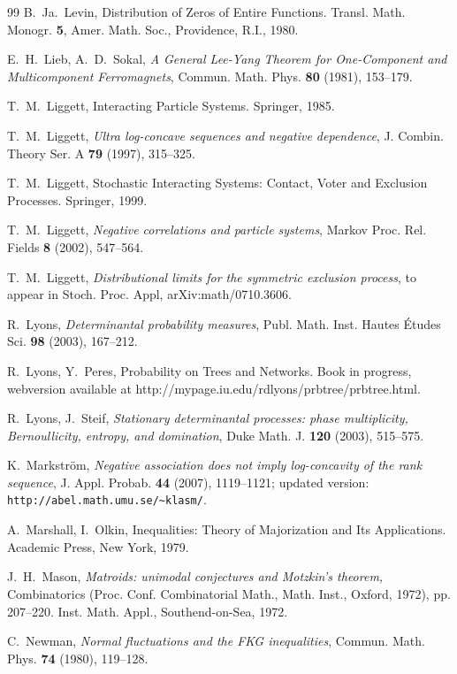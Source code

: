 \documentclass[10pt,reqno]{amsart}
\theoremstyle{plain}
\theoremstyle{definition}
\theoremstyle{remark}
\begin{document}
\begin{thebibliography}{99}
B.~Ja.~Levin, Distribution of Zeros of Entire Functions. 
Transl. Math. Monogr. {\bf 5}, Amer. Math. Soc., Providence, R.I., 1980. 

E.~H.~Lieb, A.~D.~Sokal, {\em A General Lee-Yang Theorem for One-Component and 
Multicomponent Ferromagnets}, Commun. Math. Phys. {\bf 80} (1981), 153--179.

T.~M.~Liggett, Interacting Particle Systems. Springer, 1985.

T.~M.~Liggett, {\em Ultra log-concave sequences and negative dependence}, 
J. Combin. Theory Ser. A {\bf 79} (1997), 315--325.

T.~M.~Liggett, Stochastic Interacting Systems: Contact, Voter and
Exclusion Processes. Springer, 1999.

T.~M.~Liggett, {\em  Negative correlations and particle systems}, Markov 
Proc. Rel. Fields {\bf 8} (2002), 547--564.

T.~M.~Liggett, {\em Distributional limits for the symmetric 
exclusion process}, to appear in Stoch. Proc. Appl, arXiv:math/0710.3606. 

R.~Lyons, {\em  Determinantal probability measures}, Publ. Math. Inst. 
Hautes \'Etudes Sci. {\bf 98} (2003), 167--212.

R.~Lyons, Y.~Peres, Probability on Trees and Networks. Book in progress, 
webversion available at 
http://mypage.iu.edu/rdlyons/prbtree/prbtree.html.

R.~Lyons, J.~Steif, {\em Stationary determinantal processes: phase 
multiplicity, Bernoullicity, entropy, and domination}, Duke Math. J. {\bf 120}
(2003), 515--575.

K.~Markstr\"om, {\em Negative association does not imply log-concavity of the 
rank sequence}, J. Appl. Probab. {\bf 44} (2007), 1119--1121; updated version:
\texttt{http://abel.math.umu.se/\~{}klasm/}.

A.~Marshall, I.~Olkin, Inequalities: Theory of Majorization and Its 
Applications. Academic Press, New York, 1979.

J.~H.~Mason, {\em Matroids: unimodal conjectures and Motzkin's theorem,} 
Combinatorics (Proc. Conf. Combinatorial Math., Math. Inst., Oxford, 1972), 
pp. 207--220. Inst. Math. Appl., Southend-on-Sea, 1972.

C.~Newman, {\em Normal fluctuations and the FKG inequalities}, Commun. Math. 
Phys. {\bf 74} (1980), 119--128.


\end{thebibliography}
\end{document}
